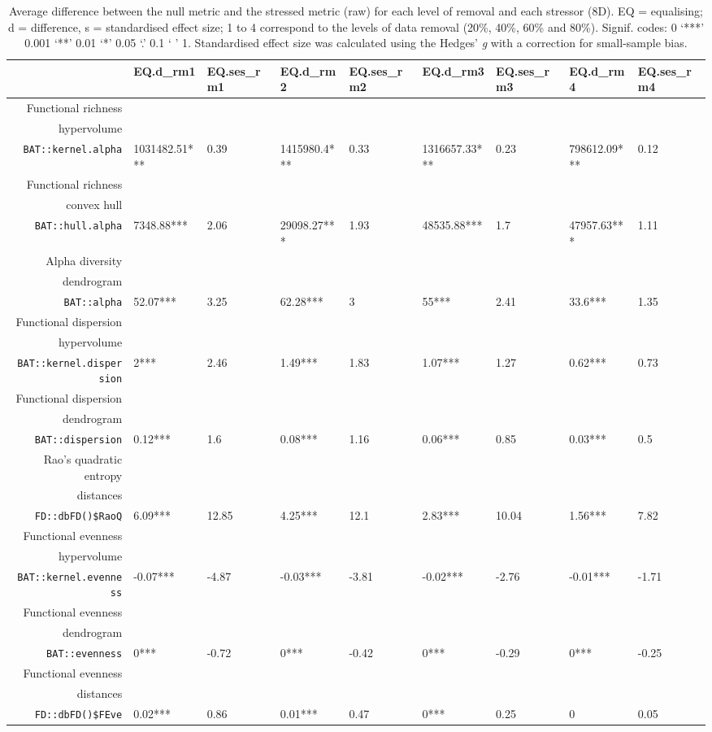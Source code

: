 \begin{table}[ht]
\centering
\scriptsize
\begin{tabular}{rllllllll}
  \hline
 & EQ.d\_rm1 & EQ.ses\_rm1 & EQ.d\_rm2 & EQ.ses\_rm2 & EQ.d\_rm3 & EQ.ses\_rm3 & EQ.d\_rm4 & EQ.ses\_rm4 \\ 
  \hline
  Functional richness\\ hypervolume\\ \texttt{BAT::kernel.alpha} & 1031482.51*** & 0.39 & 1415980.4*** & 0.33 & 1316657.33*** & 0.23 & 798612.09*** & 0.12 \\ 
  Functional richness\\ convex hull\\ \texttt{BAT::hull.alpha} & 7348.88*** & 2.06 & 29098.27*** & 1.93 & 48535.88*** & 1.7 & 47957.63*** & 1.11 \\ 
  Alpha diversity\\ dendrogram\\ \texttt{BAT::alpha} & 52.07*** & 3.25 & 62.28*** & 3 & 55*** & 2.41 & 33.6*** & 1.35 \\ 
  Functional dispersion\\ hypervolume\\ \texttt{BAT::kernel.dispersion} & 2*** & 2.46 & 1.49*** & 1.83 & 1.07*** & 1.27 & 0.62*** & 0.73 \\ 
  Functional dispersion\\ dendrogram\\ \texttt{BAT::dispersion} & 0.12*** & 1.6 & 0.08*** & 1.16 & 0.06*** & 0.85 & 0.03*** & 0.5 \\ 
  Rao's quadratic entropy\\ distances\\ \texttt{FD::dbFD()\$RaoQ} & 6.09*** & 12.85 & 4.25*** & 12.1 & 2.83*** & 10.04 & 1.56*** & 7.82 \\ 
  Functional evenness\\ hypervolume\\ \texttt{BAT::kernel.evenness} & -0.07*** & -4.87 & -0.03*** & -3.81 & -0.02*** & -2.76 & -0.01*** & -1.71 \\ 
  Functional evenness\\ dendrogram\\ \texttt{BAT::evenness} & 0*** & -0.72 & 0*** & -0.42 & 0*** & -0.29 & 0*** & -0.25 \\ 
  Functional evenness\\ distances\\ \texttt{FD::dbFD()\$FEve} & 0.02*** & 0.86 & 0.01*** & 0.47 & 0*** & 0.25 & 0 & 0.05 \\ 
   \hline
\end{tabular}
\caption{Average difference between the null metric and the stressed metric (raw) for each level of removal and each stressor (8D). EQ = equalising; d = difference, s = standardised effect size; 1 to 4 correspond to the levels of data removal (20\%, 40\%, 60\% and 80\%). Signif. codes:  0 ‘***’ 0.001 ‘**’ 0.01 ‘*’ 0.05 ‘.’ 0.1 ‘ ’ 1. Standardised effect size was calculated using the Hedges' \textit{g} with a correction for small-sample bias.} 
\end{table}
